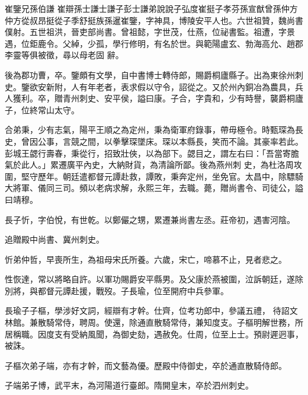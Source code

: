 
\begin{pinyinscope}

 崔鑒兄孫伯謙
 崔辯孫士謙士謙子彭士謙弟說說子弘度崔挺子孝芬孫宣猷曾孫仲方仲方從叔昂挺從子季舒挺族孫暹崔鑒，字神具，博陵安平人也。六世祖贊，魏尚書僕射。五世祖洪，晉吏部尚書。曾祖懿，字世茂，仕燕，位祕書監。祖遭，字景遇，位鉅鹿令。父綽，少孤，學行修明，有名於世。與範陽盧玄、勃海高允、趙郡李靈等俱被徵，尋以母老固
 辭。



 後為郡功曹，卒。鑒頗有文學，自中書博士轉侍郎，賜爵桐廬縣子。出為東徐州刺史。鑒欲安新附，人有年老者，表求假以守令，詔從之。又於州內銅冶為農具，兵人獲利。卒，贈青州刺史、安平侯，謚曰康。子合，字貴和，少有時譽，襲爵桐廬子，位終常山太守。



 合弟秉，少有志氣，陽平王順之為定州，秉為衛軍府錄事，帶毋極令。時甄琛為長史，曾因公事，言競之間，以拳擊琛墜床。琛以本縣長，笑而不論。其豪率若此。彭城王勰行壽春，秉從行，招致壯俠，以為部下。勰目之，謂左右曰：「吾當寄膽氣於此人。」累遷廣平內史，大納財貨，為清論所鄙。後為燕州刺
 史，為杜洛周攻圍，堅守歷年。朝廷遣都督元譚赴救，譚敗，秉奔定州，坐免官。太昌中，除驃騎大將軍、儀同三司。頻以老病求解，永熙三年，去職。薨，贈尚書令、司徒公，謚曰靖穆。



 長子忻，字伯悅，有世乾。以鄭儼之甥，累遷兼尚書左丞。莊帝初，遇害河陰。



 追贈殿中尚書、冀州刺史。



 忻弟仲哲，早喪所生，為祖母宋氏所養。六歲，宋亡，啼慕不止，見者悲之。



 性恢達，常以將略自許。以軍功賜爵安平縣男。及父康於燕被圍，泣訴朝廷，遂除別將，與都督元譚赴援，戰歿。子長瑜，位至開府中兵參軍。



 長瑜子子樞，學涉好文詞，經辯有才幹。仕齊，位考功郎中，參議五禮，
 待詔文林館。兼散騎常侍，聘周。使還，除通直散騎常侍，兼知度支。子樞明解世務，所居稱職。因度支有受納風聞，為御史劾，遇赦免。仕周，位至上士。預尉遲迥事，被誅。



 子樞次弟子端，亦有才幹，而文藝為優。歷殿中侍御史，卒於通直散騎侍郎。



 子端弟子博，武平末，為河陽道行臺郎。隋開皇末，卒於泗州刺史。




\end{pinyinscope}
